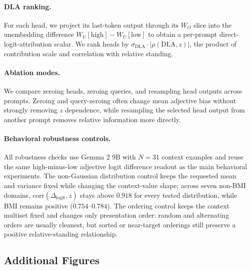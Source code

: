 \documentclass{article}
\newcommand{\logitdiff}{\ensuremath{\Delta_{\mathrm{logit}}}}
\begin{document}
\paragraph{DLA ranking.}
For each head, we project its last-token output through its $W_O$ slice into the unembedding difference $W_U[\text{high}]-W_U[\text{low}]$ to obtain a per-prompt direct-logit-attribution scalar.
We rank heads by $\sigma_{\mathrm{DLA}}\cdot|\rho(\mathrm{DLA},z)|$, the product of contribution scale and correlation with relative standing.

\paragraph{Ablation modes.}
We compare zeroing heads, zeroing queries, and resampling head outputs across prompts.
Zeroing and query-zeroing often change mean adjective bias without strongly removing $z$ dependence, while resampling the selected head output from another prompt removes relative information more directly.

\paragraph{Behavioral robustness controls.}
All robustness checks use Gemma 2 9B with $N=31$ context examples and reuse the same high-minus-low adjective logit difference readout as the main behavioral experiments.
The non-Gaussian distribution control keeps the requested mean and variance fixed while changing the context-value shape; across seven non-BMI domains, $\mathrm{corr}(\logitdiff,z)$ stays above $0.918$ for every tested distribution, while BMI remains positive ($0.754$--$0.784$).
The ordering control keeps the context multiset fixed and changes only presentation order: random and alternating orders are usually cleanest, but sorted or near-target orderings still preserve a positive relative-standing relationship.

\subsection{Additional Figures}
\label{app:additional-figures}


\end{document}
